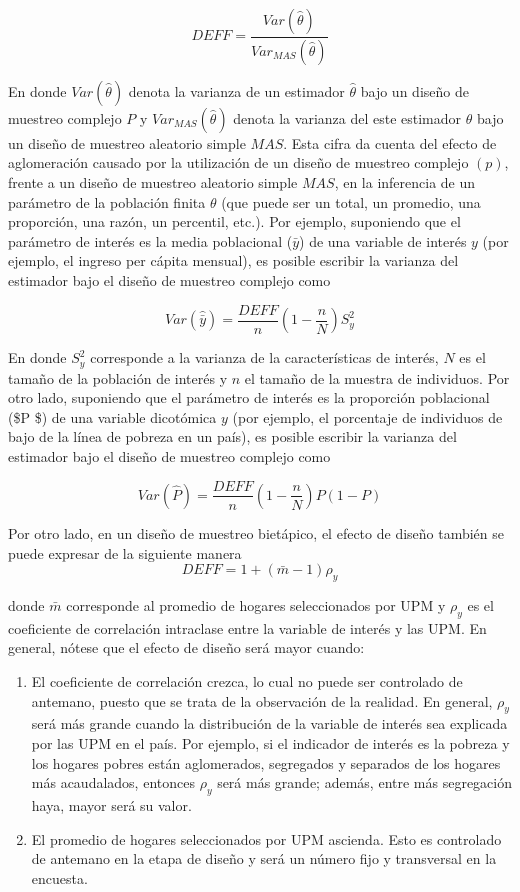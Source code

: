 \documentclass[12pt,spanish,]{book}
\providecommand{\tightlist}{%
  \setlength{\itemsep}{0pt}\setlength{\parskip}{0pt}}
\begin{document}
\[
DEFF=\frac{Var(\hat{\theta})}{Var_{MAS}(\hat{\theta})}
\]

En donde \(Var(\hat{\theta})\) denota la varianza de un estimador \(\hat{\theta}\) bajo un diseño de muestreo complejo \(P\) y \(Var_{MAS}(\hat{\theta})\) denota la varianza del este estimador \(\hat{\theta}\) bajo un diseño de muestreo aleatorio simple \(MAS\). Esta cifra da cuenta del efecto de aglomeración causado por la utilización de un diseño de muestreo complejo \((p)\), frente a un diseño de muestreo aleatorio simple \(MAS\), en la inferencia de un parámetro de la población finita \(\theta\) (que puede ser un total, un promedio, una proporción, una razón, un percentil, etc.). Por ejemplo, suponiendo que el parámetro de interés es la media poblacional (\(\bar{y}\)) de una variable de interés \(y\) (por ejemplo, el ingreso per cápita mensual), es posible escribir la varianza del estimador bajo el diseño de muestreo complejo como

\[
Var(\hat{\bar{y}}) = \frac{DEFF}{n}\left(1-\frac{n}{N}\right)S^2_{y}
\]

En donde \(S^2_{y}\) corresponde a la varianza de la características de interés, \(N\) es el tamaño de la población de interés y \(n\) el tamaño de la muestra de individuos. Por otro lado, suponiendo que el parámetro de interés es la proporción poblacional (\$P \$) de una variable dicotómica \(y\) (por ejemplo, el porcentaje de individuos de bajo de la línea de pobreza en un país), es posible escribir la varianza del estimador bajo el diseño de muestreo complejo como

\[
Var(\hat P) = \frac{DEFF}{n}\left(1-\frac{n}{N}\right)P(1-P)
\]

Por otro lado, en un diseño de muestreo bietápico, el efecto de diseño también se puede expresar de la siguiente manera
\[
DEFF = 1 + (\bar m-1)\rho_y
\]

donde \(\bar m\) corresponde al promedio de hogares seleccionados por UPM y \(\rho_y\) es el coeficiente de correlación intraclase entre la variable de interés y las UPM. En general, nótese que el efecto de diseño será mayor cuando:

\begin{enumerate}
\def\labelenumi{\arabic{enumi}.}
\tightlist
\item
  El coeficiente de correlación crezca, lo cual no puede ser controlado de antemano, puesto que se trata de la observación de la realidad. En general, \(\rho_y\) será más grande cuando la distribución de la variable de interés sea explicada por las UPM en el país. Por ejemplo, si el indicador de interés es la pobreza y los hogares pobres están aglomerados, segregados y separados de los hogares más acaudalados, entonces \(\rho_y\) será más grande; además, entre más segregación haya, mayor será su valor.
\item
  El promedio de hogares seleccionados por UPM ascienda. Esto es controlado de antemano en la etapa de diseño y será un número fijo y transversal en la encuesta.
\end{enumerate}
\end{document}
